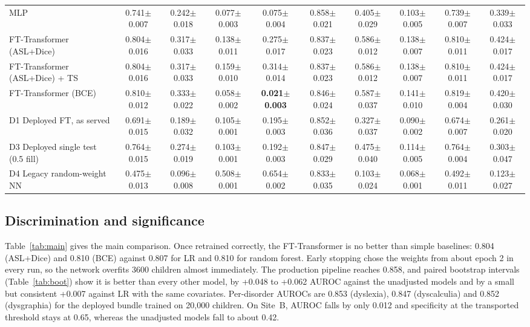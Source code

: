 \documentclass[conference]{IEEEtran}
\newcommand{\pmsd}[2]{#1{\scriptsize$\pm$#2}}
\begin{document}
\begin{table}[!t]
\begin{tabular}{lccccccccc}
MLP & \pmsd{0.741}{0.007} & \pmsd{0.242}{0.018} & \pmsd{0.077}{0.003} & \pmsd{0.075}{0.004} & \pmsd{0.858}{0.021} & \pmsd{0.405}{0.029} & \pmsd{0.103}{0.005} & \pmsd{0.739}{0.007} & \pmsd{0.339}{0.033} \\
FT-Transformer (ASL+Dice) & \pmsd{0.804}{0.016} & \pmsd{0.317}{0.033} & \pmsd{0.138}{0.011} & \pmsd{0.275}{0.017} & \pmsd{0.837}{0.023} & \pmsd{0.586}{0.012} & \pmsd{0.138}{0.007} & \pmsd{0.810}{0.011} & \pmsd{0.424}{0.017} \\
FT-Transformer (ASL+Dice) + TS & \pmsd{0.804}{0.016} & \pmsd{0.317}{0.033} & \pmsd{0.159}{0.010} & \pmsd{0.314}{0.014} & \pmsd{0.837}{0.023} & \pmsd{0.586}{0.012} & \pmsd{0.138}{0.007} & \pmsd{0.810}{0.011} & \pmsd{0.424}{0.017} \\
FT-Transformer (BCE) & \pmsd{0.810}{0.012} & \pmsd{0.333}{0.022} & \pmsd{0.058}{0.002} & \textbf{\pmsd{0.021}{0.003}} & \pmsd{0.846}{0.024} & \pmsd{0.587}{0.037} & \pmsd{0.141}{0.010} & \pmsd{0.819}{0.004} & \pmsd{0.420}{0.030} \\
\midrule
D1 Deployed FT, as served & \pmsd{0.691}{0.015} & \pmsd{0.189}{0.032} & \pmsd{0.105}{0.001} & \pmsd{0.195}{0.003} & \pmsd{0.852}{0.036} & \pmsd{0.327}{0.037} & \pmsd{0.090}{0.002} & \pmsd{0.674}{0.007} & \pmsd{0.261}{0.020} \\
D3 Deployed single test (0.5 fill) & \pmsd{0.764}{0.015} & \pmsd{0.274}{0.019} & \pmsd{0.103}{0.001} & \pmsd{0.192}{0.003} & \pmsd{0.847}{0.029} & \pmsd{0.475}{0.040} & \pmsd{0.114}{0.005} & \pmsd{0.764}{0.004} & \pmsd{0.303}{0.047} \\
D4 Legacy random-weight NN & \pmsd{0.475}{0.013} & \pmsd{0.096}{0.008} & \pmsd{0.508}{0.001} & \pmsd{0.654}{0.002} & \pmsd{0.833}{0.035} & \pmsd{0.103}{0.024} & \pmsd{0.068}{0.001} & \pmsd{0.492}{0.011} & \pmsd{0.123}{0.027} \\
\bottomrule
\end{tabular}
\end{table}

\subsection{Discrimination and significance}
Table~\ref{tab:main} gives the main comparison. Once retrained correctly, the
FT-Transformer is no better than simple baselines: 0.804 (ASL+Dice) and 0.810 (BCE)
against 0.807 for LR and 0.810 for random forest. Early stopping chose the weights
from about epoch 2 in every run, so the network overfits 3600 children almost
immediately. The production pipeline reaches 0.858, and paired bootstrap intervals
(Table~\ref{tab:boot}) show it is better than every other model, by +0.048 to +0.062
AUROC against the unadjusted models and by a small but consistent +0.007 against LR
with the same covariates. Per-disorder AUROCs are 0.853 (dyslexia), 0.847
(dyscalculia) and 0.852 (dysgraphia) for the deployed bundle trained on 20{,}000
children. On Site~B, AUROC falls by only 0.012 and specificity at the transported
threshold stays at 0.65, whereas the unadjusted models fall to about 0.42.
\end{document}
